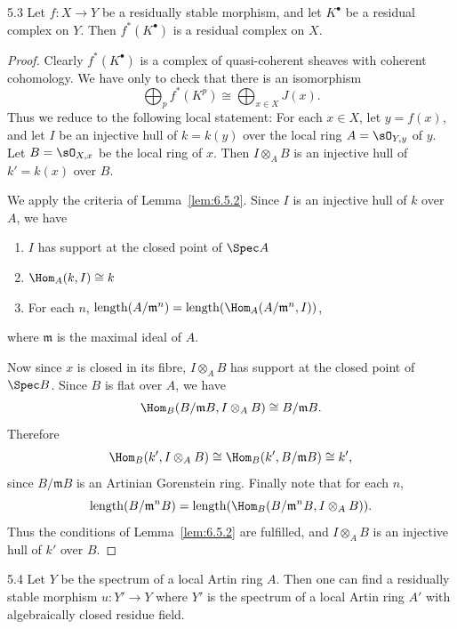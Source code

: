 \par\endgroup

\begingroup
\setlength{\emergencystretch}{2em}
\begin{bookproposition}{5.3}\label{prop:6.5.3}
Let $f\colon X\to Y$ be a residually stable morphism, and let $K^\bullet$ be a residual complex on $Y$. Then $f^{*}(K^\bullet)$ is a residual complex on $X$.
\end{bookproposition}

\begin{proof}
Clearly $f^{*}(K^\bullet)$ is a complex of quasi-coherent sheaves with coherent cohomology. We have only to check that there is an isomorphism
\[
\bigoplus_{p} f^{*}(K^{p}) \cong \bigoplus_{x\in X} J(x).
\]
Thus we reduce to the following local statement: For each $x\in X$, let $y=f(x)$, and let $I$ be an injective hull of $k=k(y)$ over the local ring $A=\sO_{Y,y}$ of $y$. Let $B=\sO_{X,x}$ be the local ring of $x$. Then $I\otimes_A B$ is an injective hull of $k'=k(x)$ over $B$.

We apply the criteria of Lemma~\ref{lem:6.5.2}. Since $I$ is an injective hull of $k$ over $A$, we have
\begin{enumerate}
\item[a)] $I$ has support at the closed point of $\Spec A$
\item[b)] $\Hom_{A}(k,I)\cong k$
\item[c)] For each $n$, $\operatorname{length}(A/\mathfrak{m}^{n}) = \operatorname{length}(\Hom_A(A/\mathfrak{m}^{n}, I))$,
\end{enumerate}
where $\mathfrak{m}$ is the maximal ideal of $A$.

Now since $x$ is closed in its fibre, $I\otimes_A B$ has support at the closed point of $\Spec B$. Since $B$ is flat over $A$, we have
\[
\Hom_{B}(B/\mathfrak{m}B, I\otimes_A B) \cong B/\mathfrak{m}B.
\]
Therefore
\[
\Hom_{B}(k', I\otimes_A B) \cong \Hom_{B}(k', B/\mathfrak{m}B) \cong k',
\]
since $B/\mathfrak{m}B$ is an Artinian Gorenstein ring. Finally note that for each $n$,
\[
\operatorname{length}(B/\mathfrak{m}^{n}B) = \operatorname{length}(\Hom_B(B/\mathfrak{m}^{n}B, I\otimes_A B)).
\]
Thus the conditions of Lemma~\ref{lem:6.5.2} are fulfilled, and $I\otimes_A B$ is an injective hull of $k'$ over $B$.
\end{proof}

\begin{bookproposition}{5.4}\label{prop:6.5.4}
Let $Y$ be the spectrum of a local Artin ring $A$. Then one can find a residually stable morphism $u\colon Y'\to Y$ where $Y'$ is the spectrum of a local Artin ring $A'$ with algebraically closed residue field.
\end{bookproposition}


